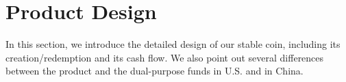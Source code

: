 \documentclass[11pt]{article}%
\numberwithin{equation}{section}
\theoremstyle{plain}
\begin{document}







\section{Product Design}\label{sec:Product-Design}
In this section, we introduce the detailed design of our stable coin, including its creation/redemption and its cash flow. We also point out several differences between the product and the dual-purpose funds in U.S. and in China.
\end{document}
